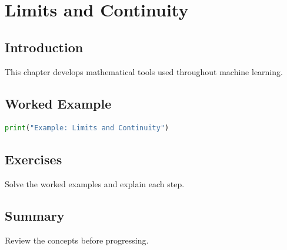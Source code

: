 \chapter{Limits and Continuity}
\label{chap:vol4-14}



\section{Introduction}
This chapter develops mathematical tools used throughout machine learning.

\section{Worked Example}
\begin{lstlisting}[language=Python]
print("Example: Limits and Continuity")
\end{lstlisting}

\section{Exercises}
\begin{exercise}
Solve the worked examples and explain each step.
\end{exercise}

\section{Summary}
Review the concepts before progressing.

